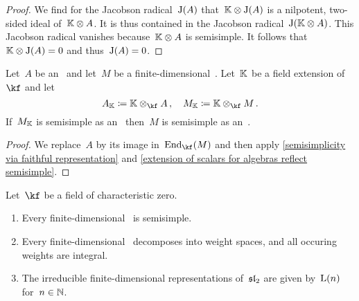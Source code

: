 \documentclass[a4paper, 11pt, oneside]{scrartcl}
\begin{document}
\begin{proof}
  We find for the Jacobson radical~$\operatorname{J}(A)$ that~$\mathbb{K} \otimes \operatorname{J}(A)$ is a nilpotent, two-sided ideal of~$\mathbb{K} \otimes A$.
  It is thus contained in the Jacobson radical~$\operatorname{J}(\mathbb{K} \otimes A)$.
  This Jacobson radical vanishes because~$\mathbb{K} \otimes A$ is semisimple.
  It follows that~$\mathbb{K} \otimes \operatorname{J}(A) = 0$ and thus~$\operatorname{J}(A) = 0$.
\end{proof}

\begin{corollary}
  \label{extension of scalars reflects semisimplicity of fd representations}
  Let~$A$ be an~\algebra{$\kf$} and let~$M$ be a finite-dimensional~.
  Let~$\mathbb{K}$ be a field extension of~$\kf$ and let
  \[
    A_{\Kf} \defined \Kf \tensor_{\kf} A \,,
    \quad
    M_{\Kf} \defined \Kf \tensor_{\kf} M \,.
  \]
  If~$M_{\mathbb{K}}$ is semisimple as an~ then~$M$ is semisimple as an~.
\end{corollary}

\begin{proof}
  We replace~$A$ by its image in~$\End_{\kf}(M)$ and then apply \cref{semisimplicity via faithful representation} and \cref{extension of scalars for algebras reflect semisimple}.
\end{proof}


\begin{theorem}
  Let~$\kf$ be a field of characteristic zero.
  \begin{enumerate}
    \item
      Every finite-dimensional~ is semisimple.
    \item
      Every finite-dimensional~ decomposes into weight spaces, and all occuring weights are integral.
    \item
      The irreducible finite-dimensional representations of~$\mathfrak{sl}_2$ are given by~$\operatorname{L}(n)$ for~$n \in \mathbb{N}$.
  \end{enumerate}
\end{theorem}
\end{document}
